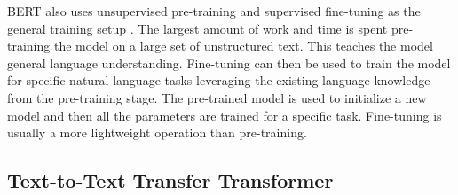\documentclass[twoside]{article}
\begin{document}
BERT also uses unsupervised pre-training and supervised fine-tuning as the general training setup \cite{devlin_bert_2019}.
The largest amount of work and time is spent pre-training the model on a large set of unstructured
text. This teaches the model general language understanding. Fine-tuning can then be used to 
train the model for specific natural language tasks leveraging the existing language knowledge 
from the pre-training stage. The pre-trained model is used to initialize a new model and 
then all the parameters are trained for a specific task. Fine-tuning is usually a more 
lightweight operation than pre-training. \cite{devlin_bert_2019}

\subsection{Text-to-Text Transfer Transformer}
\end{document}
